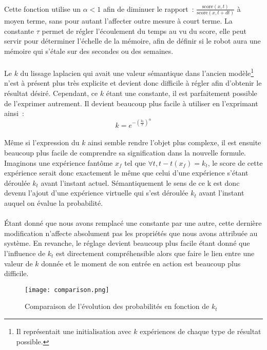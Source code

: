 \paragraph{}
Cette fonction utilise un $\alpha < 1$ afin de diminuer le rapport~:
$\frac{\mathrm{score}(x,t)}{\mathrm{score}(x, t + dt)}$ à moyen terme, sans
pour autant l'affecter outre mesure à court terme. La constante $\tau$ permet
de régler l'écoulement du temps au vu du score, elle peut servir pour
déterminer l'échelle de la mémoire, afin de définir si le robot aura une
mémoire qui s'étale sur des secondes ou des semaines.


\paragraph{}
Le $k$ du lissage laplacien qui avait une valeur sémantique dans l'ancien
modèle\footnote{Il représentait une initialisation avec $k$ expériences de
chaque type de résultat possible.} n'est à présent plus très explicite et
devient donc difficile à régler afin d'obtenir le résultat désiré. Cependant,
ce $k$ étant une constante, il est parfaitement possible de l'exprimer
autrement. Il devient beaucoup plus facile à utiliser en l'exprimant ainsi~:
$$k = e^{-\left (\frac{k_t}{\tau} \right )^{\alpha}}$$

\paragraph{}
Même si l'expression du $k$ ainsi semble rendre l'objet plus complexe, il est
ensuite beaucoup plus facile de comprendre sa signification dans la nouvelle
formule. Imaginons une expérience fantôme $x_f$ tel que
$\forall t, t - t(x_f) = k_t$, le score de cette expérience serait donc
exactement le même que celui d'une expérience s'étant déroulée $k_t$ avant
l'instant actuel. Sémantiquement le sens de ce k est donc devenu l'ajout d'une
expérience virtuelle qui s'est déroulée $k_t$ avant l'instant auquel on évalue
la probabilité.

\paragraph{}
Étant donné que nous avons remplacé une constante par une autre, cette
dernière modification n'affecte absolument pas les propriétés que nous avons
attribuée au système. En revanche, le réglage devient beaucoup plus facile
étant donné que l'influence de $k_t$ est directement compréhensible alors
que faire le lien entre une valeur de $k$ donnée et le moment de son entrée en
action est beaucoup plus difficile.


\begin{figure}[H]
  \caption{Comparaison de l'évolution des probabilités en fonction de $k_t$}
  \texttt{[image: comparison.png]}
\end{figure}


